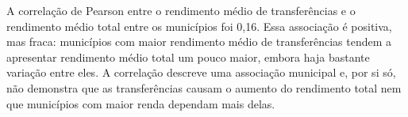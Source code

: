 A correlação de Pearson entre o rendimento médio de transferências e o rendimento médio total entre os municípios foi 0,16. Essa associação é positiva, mas fraca: municípios com maior rendimento médio de transferências tendem a apresentar rendimento médio total um pouco maior, embora haja bastante variação entre eles. A correlação descreve uma associação municipal e, por si só, não demonstra que as transferências causam o aumento do rendimento total nem que municípios com maior renda dependam mais delas.
